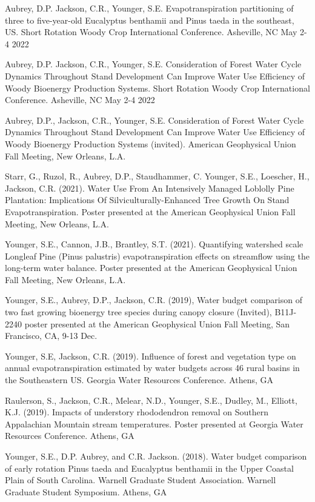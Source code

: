 \documentclass[10pt,letterpaper]{article}
\begin{document}
	\begin{hangparas}{.25in}{1}
		
		Aubrey, D.P. Jackson, C.R., Younger, S.E. Evapotranspiration partitioning of three to five-year-old Eucalyptus benthamii and Pinus taeda in the southeast, US. Short Rotation Woody Crop International Conference. Asheville, NC May 2-4 2022
		
		Aubrey, D.P. Jackson, C.R., Younger, S.E. Consideration of Forest Water Cycle Dynamics Throughout Stand Development Can Improve Water Use Efficiency of Woody Bioenergy Production Systems. Short Rotation Woody Crop International Conference. Asheville, NC May 2-4 2022
		
		Aubrey, D.P., Jackson, C.R., Younger, S.E. Consideration of Forest Water Cycle Dynamics Throughout Stand Development Can Improve Water Use Efficiency of Woody Bioenergy Production Systems (invited). American Geophysical Union Fall Meeting, New Orleans, L.A.
		
		Starr, G., Ruzol, R., Aubrey, D.P., Staudhammer, C. Younger, S.E., Loescher, H., Jackson, C.R. (2021). Water Use From An Intensively Managed Loblolly Pine Plantation: Implications Of Silviculturally-Enhanced Tree Growth On Stand Evapotranspiration. Poster presented at the American Geophysical Union Fall Meeting, New Orleans, L.A.
		
		Younger, S.E., Cannon, J.B., Brantley, S.T. (2021). Quantifying watershed scale Longleaf Pine (Pinus palustris) evapotranspiration effects on streamflow using the long-term water balance. Poster presented at the American Geophysical Union Fall Meeting, New Orleans, L.A.
		
		Younger, S.E., Aubrey, D.P., Jackson, C.R. (2019), Water budget comparison of two fast growing bioenergy tree species during canopy closure (Invited), B11J-2240 poster presented at the American Geophysical Union Fall Meeting, San Francisco, CA, 9-13 Dec.
		
		Younger, S.E, Jackson, C.R. (2019). Influence of forest and vegetation type on annual evapotranspiration estimated by water budgets across 46 rural basins in the Southeastern US. Georgia Water Resources Conference. Athens, GA
		
		Raulerson, S., Jackson, C.R., Melear, N.D., Younger, S.E., Dudley, M., Elliott, K.J. (2019). Impacts of understory rhododendron removal on Southern Appalachian Mountain stream temperatures. Poster presented at Georgia Water Resources Conference. Athens, GA
		
		Younger, S.E., D.P. Aubrey, and C.R. Jackson. (2018). Water budget comparison of early rotation Pinus taeda and Eucalyptus benthamii in the Upper Coastal Plain of South Carolina. Warnell Graduate Student Association. Warnell Graduate Student Symposium. Athens, GA
		

\end{hangparas}
\end{document}
